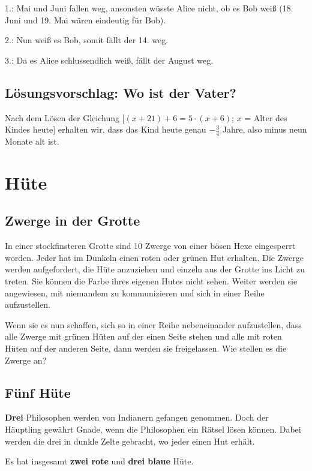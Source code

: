 {1.: Mai und Juni fallen weg, ansonsten wüsste Alice nicht, ob es Bob weiß (18.
Juni und 19. Mai wären eindeutig für Bob).

2.: Nun weiß es Bob, somit fällt der 14. weg.

3.: Da es Alice schlussendlich weiß, fällt der August weg.


\subsection{Lösungsvorschlag: Wo ist der Vater?}

Nach dem Lösen der Gleichung [$(x+21)+6 = 5\cdot{}(x+6)$; $x$ = Alter des Kindes
heute] erhalten wir, dass das Kind heute genau $-\frac34$ Jahre, also minus neun
Monate alt ist.

}%
\newpage


\section{Hüte}
\subsection{Zwerge in der Grotte}
In einer stockfinsteren Grotte sind 10 Zwerge von einer bösen Hexe eingesperrt
worden. Jeder hat im Dunkeln einen roten oder grünen Hut erhalten. Die
Zwerge werden aufgefordert, die Hüte anzuziehen und einzeln aus der Grotte
ins Licht zu treten. Sie können die Farbe ihres eigenen Hutes nicht sehen.
Weiter werden sie angewiesen, mit niemandem zu kommunizieren und sich in
einer Reihe aufzustellen.

Wenn sie es nun schaffen, sich so in einer Reihe nebeneinander aufzustellen,
dass alle Zwerge mit grünen Hüten auf der einen Seite stehen und alle mit roten
Hüten auf der anderen Seite, dann werden sie freigelassen.
Wie stellen es die Zwerge an?


\subsection{Fünf Hüte}
\textbf{Drei} Philosophen werden von Indianern gefangen genommen. Doch der
Häuptling gewährt Gnade, wenn die Philosophen ein Rätsel lösen können. Dabei
werden die drei in dunkle Zelte gebracht, wo jeder einen Hut erhält.

Es hat insgesamt \textbf{zwei rote} und \textbf{drei blaue} Hüte.


